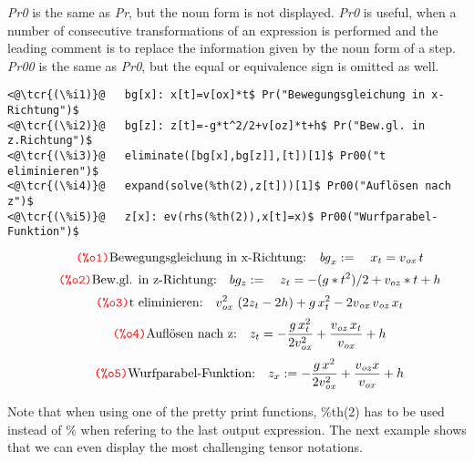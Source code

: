 \documentclass[../Maxima_Workbook.tex]{subfiles}
\begin{document}
\lz \emph{Pr0} is the same as \emph{Pr}, but the noun form is not displayed. \emph{Pr0} is useful, when a number of consecutive transformations of an expression is performed and the leading comment is to replace the information given by the noun form of a step. \emph{Pr00} is the same as \emph{Pr0}, but the equal or equivalence sign is omitted as well.

\lz \begin{small}
\color{blue} \leqn
\begin{lstlisting}
<@\tcr{(\%i1)}@   bg[x]: x[t]=v[ox]*t$ Pr("Bewegungsgleichung in x-Richtung")$
<@\tcr{(\%i2)}@   bg[z]: z[t]=-g*t^2/2+v[oz]*t+h$ Pr("Bew.gl. in z.Richtung")$
<@\tcr{(\%i3)}@   eliminate([bg[x],bg[z]],[t])[1]$ Pr00("t eliminieren")$
<@\tcr{(\%i4)}@   expand(solve(%th(2),z[t]))[1]$ Pr00("Auflösen nach z")$
<@\tcr{(\%i5)}@   z[x]: ev(rhs(%th(2)),x[t]=x)$ Pr00("Wurfparabel-Funktion")$
\end{lstlisting}
\vspace{-4mm} \[\tag*{\tcr{\ttfamily (\%o1)}} \text{Bewegungsgleichung in x-Richtung:} \quad {{\mathit{bg}}_x} :=  \quad {x_t}={v_{\mathit{ox}}}\, t \]
\vspace{-10mm} \[\tag*{\tcr{\ttfamily (\%o2)}} \text{Bew.gl. in z-Richtung:} \quad bg_z := \quad  z_t=-(g*t^2)/2+v_{oz}*t+h \]
\vspace{-10mm} \[\tag*{\tcr{\ttfamily (\%o3)}} \text{t eliminieren:} \quad {{v}_{\mathit{ox}}^{2}}\, \left( 2 {z_t}-2 h\right) +g\, {{x}_{t}^{2}}-2 {v_{\mathit{ox}}}\, {v_{\mathit{oz}}}\, {x_t} \]
\vspace{-9mm} \[\tag*{\tcr{\ttfamily (\%o4)}} \text{Auflösen nach z:} \quad {z_t}=-\frac{g\, {{x}_{t}^{2}}}{2 {{v}_{\mathit{ox}}^{2}}}+\frac{{v_{\mathit{oz}}}\, {x_t}}{{v_{\mathit{ox}}}}+h \]
\vspace{-6mm} \[\tag*{\tcr{\ttfamily (\%o5)}} \text{Wurfparabel-Funktion:} \quad {z_x} :=  -\frac{g\, {{x}^{2}}}{2 {{v}_{\mathit{ox}}^{2}}}+\frac{{v_{\mathit{oz}}} x}{{v_{\mathit{ox}}}}+h \]
\color{black}
\end{small} \reqn
\vspace{-3mm} 

\lz Note that when using one of the pretty print functions, \%th(2) has to be used instead of \% when refering to the last output expression. The next example shows that we can even display the most challenging tensor notations.
\end{document}
